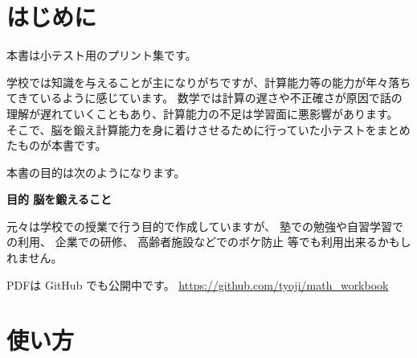 %
%

\section{はじめに}

本書は小テスト用のプリント集です。

学校では知識を与えることが主になりがちですが、計算能力等の能力が年々落ちてきているように感じています。
数学では計算の遅さや不正確さが原因で話の理解が遅れていくこともあり、計算能力の不足は学習面に悪影響があります。
そこで、脳を鍛え計算能力を身に着けさせるために行っていた小テストをまとめたものが本書です。

本書の目的は次のようになります。
\begin{center}
 \textbf{目的 脳を鍛えること}
\end{center}

元々は学校での授業で行う目的で作成していますが、
塾での勉強や自習学習での利用、
企業での研修、
高齢者施設などでのボケ防止
等でも利用出来るかもしれません。

PDFは GitHub でも公開中です。
\url{https://github.com/tyoji/math_workbook}


\section{使い方}

